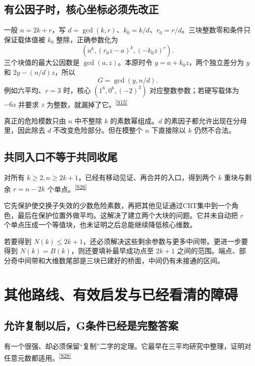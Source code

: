 \documentclass[11pt,a4paper,oneside,openany]{book}
\newcommand{\src}[1]{\textsuperscript{\hyperref[source:#1]{[#1]}}}
\theoremstyle{definition}\newtheorem{example}[theorem]{例}\newtheorem{conjecture}[theorem]{猜想}
\numberwithin{equation}{chapter}\setcounter{tocdepth}{1}
\begin{document}
\section{有公因子时，核心坐标必须先改正}
一般 $n=2k+r$，写 $d=\gcd(k,r)$、$k_0=k/d$、$r_0=r/d$。三块整数零和条件只保证载体值被 $k_0$ 整除，正确参数化为
\[(a^k,(r_0z-a)^k,(-k_0z)^r).
\]
三个块值的最大公因数是 $\gcd(a,z)$。本原时令 $y=a+k_0z$，两个独立差分为 $y$ 和 $2y-(n/d)z$，所以
\[G=\gcd(y,n/d).
\]
例如六平均、$r=3$ 时，核心 $(1^6,0^6,(-2)^3)$ 对应整数参数；若硬写载体为 $-6z$ 并要求 $z$ 为整数，就漏掉了它。\src{S15}

真正的危险模数只由 $n$ 中不整除 $k$ 的素数幂组成。$d$ 的素因子都允许出现在分母里，因此除去 $d$ 不改变危险部分。但在模整个 $n$ 下直接除以 $k$ 仍然不合法。

\section{共同入口不等于共同收尾}
对所有 $k\ge2,n\ge2k+1$，已经有移动见证、再合并的入口，得到两个 $k$ 重块与剩余 $r=n-2k$ 个单点。\src{S26}

它先保护使交换子失效的少数危险素数，再把其他见证通过CRT集中到一个角色，最后在保护位置外做平均。这解决了建立两个大块的问题。它并未自动把 $r$ 个单点压成一个等值块，也未证明之后总能继续降低核心维数。

若要得到 $N(k)\le2k+1$，还必须解决这些剩余参数与更多中间带。更进一步要得到 $N(k)=B(k)$，则还要填补最早成功点至 $2k+1$ 之间的范围。端点、部分奇中间带和大维数尾部是三块已建好的桥面，中间仍有未接通的区间。


\chapter{其他路线、有效启发与已经看清的障碍}\label{ch:obstacles}
\section{允许复制以后，G条件已经是完整答案}
有一个很强、却必须保留“复制”二字的定理。它最早在三平均研究中整理，证明对任意元数都适用。\src{S28}
\end{document}

